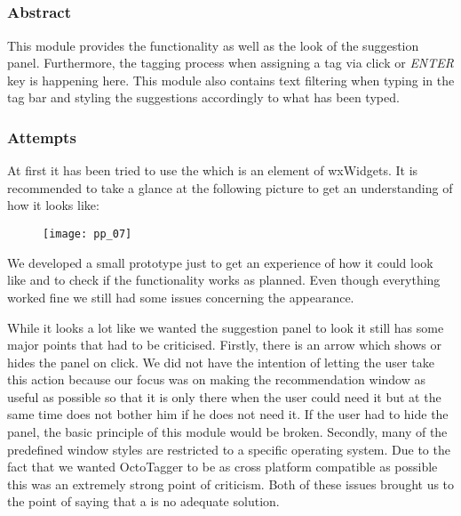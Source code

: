 \subsection{}
\label{sub:mod:autocomplete}
\def\kapitelautor{Christoph Führer}

\subsubsection{Abstract}

This module provides the functionality as well as the look of the suggestion panel. Furthermore, the tagging process when assigning a tag via click or \textit{ENTER} key is happening here. This module also contains text filtering when typing in the tag bar and styling the suggestions accordingly to what has been typed.

\subsubsection{Attempts}

At first it has been tried to use the  \cite{wxcombobox} which is an element of wxWidgets. It is recommended to take a glance at the following picture to get an understanding of how it looks like:

\begin{figure}[H]
    \centering
    \texttt{[image: pp\_07]}
    \caption{}
\end{figure}

We developed a small prototype just to get an experience of how it could look like and to check if the functionality works as planned. Even though everything worked fine we still had some issues concerning the appearance.

While it looks a lot like we wanted the suggestion panel to look it still has some major points that had to be criticised. Firstly, there is an arrow which shows or hides the panel on click. We did not have the intention of letting the user take this action because our focus was on making the recommendation window as useful as possible so that it is only there when the user could need it but at the same time does not bother him if he does not need it. If the user had to hide the panel, the basic principle of this module would be broken. Secondly, many of the predefined window styles are restricted to a specific operating system. Due to the fact that we wanted OctoTagger to be as cross platform compatible as possible this was an extremely strong point of criticism. Both of these issues brought us to the point of saying that a  is no adequate solution.


